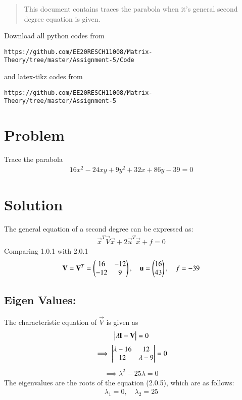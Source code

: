 \documentclass[journal,12pt,twocolumn]{IEEEtran}
\begin{document}
%
\begin{abstract}
This document contains traces the parabola when it's general second degree equation is given.
\end{abstract}
Download all python codes from 
%
\begin{lstlisting}
https://github.com/EE20RESCH11008/Matrix-Theory/tree/master/Assignment-5/Code
\end{lstlisting}
%
and latex-tikz codes from 
%
\begin{lstlisting}
https://github.com/EE20RESCH11008/Matrix-Theory/tree/master/Assignment-5
\end{lstlisting}
\section{Problem}
Trace the parabola
\begin{align}
   16x^2-24xy+9y^2+32x+86y-39=0
\end{align}
\section{Solution}
The general equation of a second degree can be expressed as: 
\begin{align}
   \vec{x}^T\vec{V}\vec{x}+2\vec{u}^T\vec{x}+f=0
\end{align}
Comparing 1.0.1 with 2.0.1
\begin{align}
\mathbf{V}=\mathbf{V}^T =\begin{pmatrix}16 & -12 \\ -12 & 9 \end{pmatrix}, \quad\mathbf{u}=\begin{pmatrix}16 \\ 43\end{pmatrix},\quad f=-39 \label{eq:parametrics}
\end{align}
\subsection{Eigen Values:}
The characteristic equation of $\vec{V}$ is given as
\begin{align}
\begin{vmatrix}\lambda \mathbf{I}-\mathbf{V}\end{vmatrix} = 0
\end{align}
\begin{align}
\implies \begin{vmatrix}\lambda-16 & 12 \\ 12 & \lambda-9\end{vmatrix} =0
\end{align}
\begin{align}
\implies \lambda^2-25\lambda=0
\end{align}
The eigenvalues are the roots of the equation (2.0.5), which are as follows:
\begin{align}
 \lambda_1=0, \quad  \lambda_2=25 \label{eq:eigenval}
\end{align}
\end{document}
